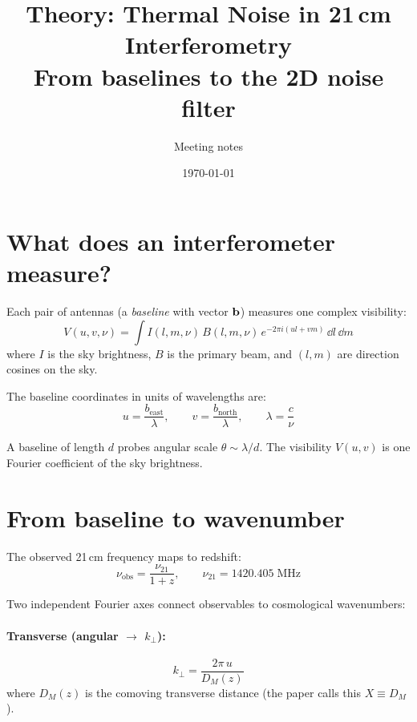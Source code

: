 \documentclass[11pt,a4paper]{article}
\title{Theory: Thermal Noise in 21\,cm Interferometry\\[4pt]
\large From baselines to the 2D noise filter}
\author{Meeting notes}
\date{\today}
\newcommand{\kperp}{k_\perp}
\begin{document}
\maketitle
\tableofcontents
\newpage

\section{What does an interferometer measure?}

Each pair of antennas (a \emph{baseline} with vector $\vb{b}$) measures one complex visibility:
\begin{equation}
    V(u,v,\nu) = \int I(l,m,\nu)\, B(l,m,\nu)\, e^{-2\pi i(ul + vm)}\, \dd{l}\,\dd{m}
\end{equation}
where $I$ is the sky brightness, $B$ is the primary beam, and $(l,m)$ are direction cosines on the sky.

The baseline coordinates in units of wavelengths are:
\begin{equation}
    u = \frac{b_\mathrm{east}}{\lambda}, \qquad
    v = \frac{b_\mathrm{north}}{\lambda}, \qquad
    \lambda = \frac{c}{\nu}
\end{equation}

A baseline of length $d$ probes angular scale $\theta \sim \lambda/d$. The visibility $V(u,v)$ is one Fourier coefficient of the sky brightness.

\section{From baseline to wavenumber}

The observed 21\,cm frequency maps to redshift:
\begin{equation}
    \nu_\mathrm{obs} = \frac{\nu_{21}}{1+z}, \qquad \nu_{21} = 1420.405\;\mathrm{MHz}
\end{equation}

Two independent Fourier axes connect observables to cosmological wavenumbers:

\paragraph{Transverse (angular $\to$ $\kperp$):}
\begin{equation}
    \kperp = \frac{2\pi\, u}{D_M(z)}
\end{equation}
where $D_M(z)$ is the comoving transverse distance (the paper calls this $X \equiv D_M$).
\end{document}
